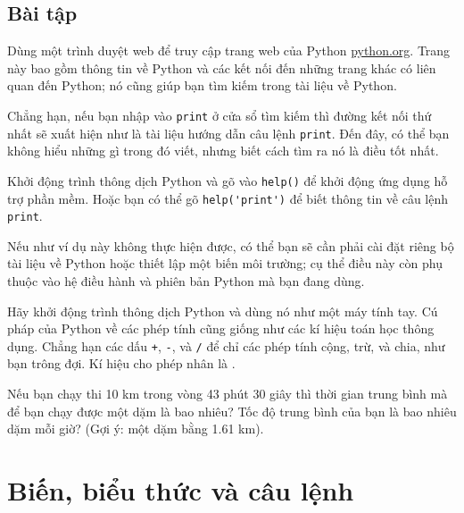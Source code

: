 \documentclass[11pt]{book}
\begin{document}
\section{Bài tập}

\begin{ex}
Dùng một trình duyệt web để truy cập trang web của Python
\url{python.org}. Trang này bao gồm thông tin về Python và
các kết nối đến những trang khác có liên quan đến Python; nó cũng
giúp bạn tìm kiếm trong tài liệu về  Python.

Chẳng hạn, nếu bạn nhập vào {\tt print} ở cửa sổ tìm kiếm thì
đường kết nối thứ nhất sẽ xuất hiện như là tài liệu hướng dẫn
câu lệnh {\tt print}. Đến đây, có thể bạn không hiểu những gì
trong đó viết, nhưng biết cách tìm ra nó là điều tốt nhất.

\end{ex}

\begin{ex}
Khởi động trình thông dịch Python và gõ vào {\tt help()} để
khởi động ứng dụng hỗ trợ phần mềm. Hoặc bạn có thể gõ
\verb"help('print')" để biết thông tin về câu lệnh {\tt print}.

Nếu như ví dụ này không thực hiện được, có thể bạn sẽ cần phải
cài đặt riêng bộ tài liệu về Python hoặc thiết lập một biến
môi trường; cụ thể điều này còn phụ thuộc vào hệ điều hành và
phiên bản Python mà bạn đang dùng.
\end{ex}

\begin{ex}
Hãy khởi động trình thông dịch Python và dùng nó như một máy tính
tay. Cú pháp của Python về các phép tính cũng giống như 
các kí hiệu toán học thông dụng. Chẳng hạn các dấu 
{\tt +}, {\tt -}, và {\tt /} để chỉ các phép tính cộng, trừ,
và chia, như bạn trông đợi. Kí hiệu cho phép nhân là {\tt *}.

Nếu bạn chạy thi 10 km trong vòng 43 phút 30 giây thì thời gian trung
bình mà để bạn chạy được một dặm là bao nhiêu? Tốc độ trung bình của
bạn là bao nhiêu dặm mỗi giờ? (Gợi ý: một dặm bằng 1.61 km).


\end{ex}




\chapter{Biến, biểu thức và câu lệnh}
\end{document}
